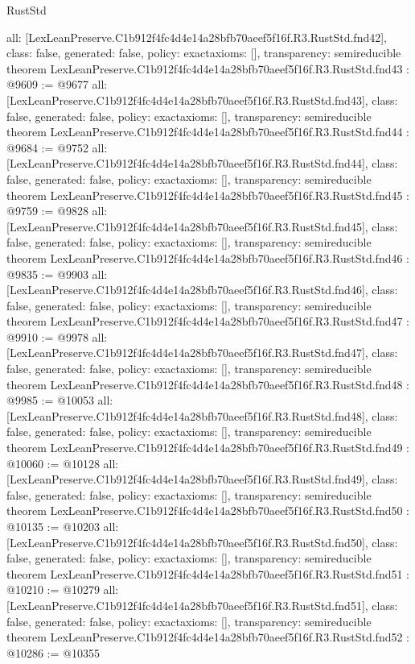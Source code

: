 \begin{lexlean}{RustStd}
\begin{coremodule}
{  all: [LexLeanPreserve.C1b912f4fc4d4e14a28bfb70aeef5f16f.R3.RustStd.fnd42],
  class: false,
  generated: false,
  policy: exact{axioms: []},
  transparency: semireducible
}
theorem LexLeanPreserve.C1b912f4fc4d4e14a28bfb70aeef5f16f.R3.RustStd.fnd43 : @9609 := @9677 {
  all: [LexLeanPreserve.C1b912f4fc4d4e14a28bfb70aeef5f16f.R3.RustStd.fnd43],
  class: false,
  generated: false,
  policy: exact{axioms: []},
  transparency: semireducible
}
theorem LexLeanPreserve.C1b912f4fc4d4e14a28bfb70aeef5f16f.R3.RustStd.fnd44 : @9684 := @9752 {
  all: [LexLeanPreserve.C1b912f4fc4d4e14a28bfb70aeef5f16f.R3.RustStd.fnd44],
  class: false,
  generated: false,
  policy: exact{axioms: []},
  transparency: semireducible
}
theorem LexLeanPreserve.C1b912f4fc4d4e14a28bfb70aeef5f16f.R3.RustStd.fnd45 : @9759 := @9828 {
  all: [LexLeanPreserve.C1b912f4fc4d4e14a28bfb70aeef5f16f.R3.RustStd.fnd45],
  class: false,
  generated: false,
  policy: exact{axioms: []},
  transparency: semireducible
}
theorem LexLeanPreserve.C1b912f4fc4d4e14a28bfb70aeef5f16f.R3.RustStd.fnd46 : @9835 := @9903 {
  all: [LexLeanPreserve.C1b912f4fc4d4e14a28bfb70aeef5f16f.R3.RustStd.fnd46],
  class: false,
  generated: false,
  policy: exact{axioms: []},
  transparency: semireducible
}
theorem LexLeanPreserve.C1b912f4fc4d4e14a28bfb70aeef5f16f.R3.RustStd.fnd47 : @9910 := @9978 {
  all: [LexLeanPreserve.C1b912f4fc4d4e14a28bfb70aeef5f16f.R3.RustStd.fnd47],
  class: false,
  generated: false,
  policy: exact{axioms: []},
  transparency: semireducible
}
theorem LexLeanPreserve.C1b912f4fc4d4e14a28bfb70aeef5f16f.R3.RustStd.fnd48 : @9985 := @10053 {
  all: [LexLeanPreserve.C1b912f4fc4d4e14a28bfb70aeef5f16f.R3.RustStd.fnd48],
  class: false,
  generated: false,
  policy: exact{axioms: []},
  transparency: semireducible
}
theorem LexLeanPreserve.C1b912f4fc4d4e14a28bfb70aeef5f16f.R3.RustStd.fnd49 : @10060 := @10128 {
  all: [LexLeanPreserve.C1b912f4fc4d4e14a28bfb70aeef5f16f.R3.RustStd.fnd49],
  class: false,
  generated: false,
  policy: exact{axioms: []},
  transparency: semireducible
}
theorem LexLeanPreserve.C1b912f4fc4d4e14a28bfb70aeef5f16f.R3.RustStd.fnd50 : @10135 := @10203 {
  all: [LexLeanPreserve.C1b912f4fc4d4e14a28bfb70aeef5f16f.R3.RustStd.fnd50],
  class: false,
  generated: false,
  policy: exact{axioms: []},
  transparency: semireducible
}
theorem LexLeanPreserve.C1b912f4fc4d4e14a28bfb70aeef5f16f.R3.RustStd.fnd51 : @10210 := @10279 {
  all: [LexLeanPreserve.C1b912f4fc4d4e14a28bfb70aeef5f16f.R3.RustStd.fnd51],
  class: false,
  generated: false,
  policy: exact{axioms: []},
  transparency: semireducible
}
theorem LexLeanPreserve.C1b912f4fc4d4e14a28bfb70aeef5f16f.R3.RustStd.fnd52 : @10286 := @10355 {
}
\end{coremodule}
\end{lexlean}
